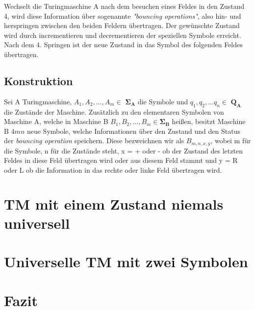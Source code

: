 \documentclass[12pt, a4paper]{article}
\begin{document}
Wechselt die Turingmaschine A nach dem besuchen eines Feldes in den Zustand 4, wird diese Information über sogenannte \textit{"bouncing operations"}, also hin- und herspringen zwischen den beiden Feldern übertragen. Der gewünschte Zustand wird durch incrementieren und decrementieren der speziellen Symbole erreicht. Nach dem 4. Springen ist der neue Zustand in das Symbol des folgenden Feldes übertragen.

\subsection{Konstruktion}

Sei A Turingmaschine, $ A_1,A_2,...,A_m \in$ $\mathbf{\Sigma_A}$ die Symbole und $q_1,q_2,...q_n \in$ $\mathbf{Q_A}$ die Zustände der Maschine. Zusätzlich zu den elementaren Symbolen von Maschine A, welche in Maschine B $B_1,B_2,...,B_m \in \mathbf{\Sigma_B}$ heißen, besitzt Maschine B $4mn$ neue Symbole, welche Informationen über den Zustand und den Status der \textit{bouncing operation} speichern.
Diese bezweichnen wir als $B_{m,n,x,y}$, wobei m für die Symbole, n für die Zustände steht, x = + oder - ob der Zustand des letzten Feldes in diese Feld übertragen wird oder aus diesem Feld stammt und y = R oder L ob die Information in das rechte oder linke Feld übertragen wird.  

\section{TM mit einem Zustand niemals universell}

\section{Universelle TM mit zwei Symbolen}

\section{Fazit}
\end{document}
